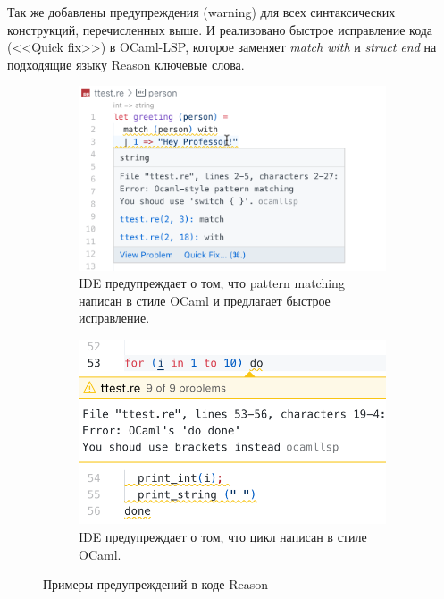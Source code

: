 Так же добавлены предупреждения (warning) для всех синтаксических конструкций, перечисленных выше. И реализовано быстрое исправление кода (<<Quick fix>>) в OCaml-LSP, которое заменяет {\it match with} и {\it struct end} на подходящие языку Reason ключевые слова.
\begin{figure}[h]
	\begin{subfigure}[t]{0.5\textwidth}
		\includegraphics[width=\linewidth]{screenshots/05.png}
		\caption{IDE предупреждает о том, что pattern matching написан в стиле OCaml и \newline предлагает быстрое исправление.}
	\end{subfigure}
	\begin{subfigure}[t]{0.5\textwidth}
		\includegraphics[width=\linewidth]{screenshots/06.png}
		\caption{IDE предупреждает о том, что цикл написан в стиле OCaml.}
	\end{subfigure}
\caption{Примеры предупреждений в коде Reason}
\end{figure}
\newpage
